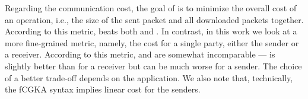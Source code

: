 Regarding the communication cost, the goal of \cite{hashimoto2021cmpke} is to minimize the overall cost of an operation, i.e., the size of the sent packet and all downloaded packets together. According to this metric, \protCMPKE beats both \saik and \protITK.
In contrast, in this work we look at a more fine-grained metric, namely, the cost for a single party, either the sender or a receiver. According to this metric, \protCMPKE and \saik are somewhat incomparable --- \protCMPKE is slightly better than \saik for a receiver but can be much worse for a sender. The choice of a better trade-off depends on the application.
%
We also note that, technically, the fCGKA syntax implies linear cost for the senders.

%


